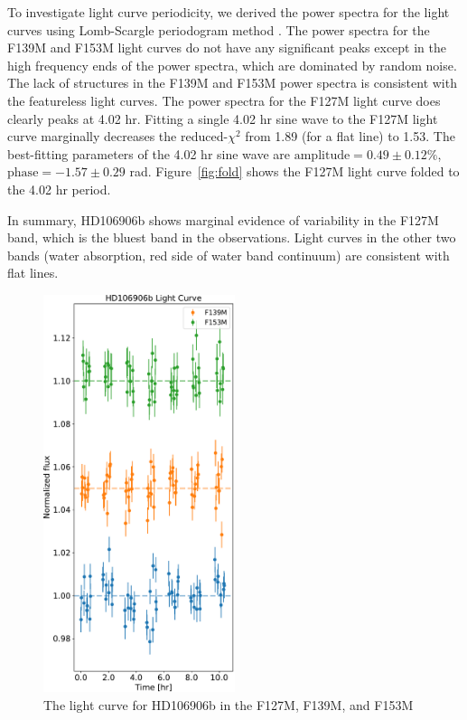 \documentclass[modern]{aastex62}
\begin{document}
To investigate light curve periodicity, we derived the power spectra for the light curves using Lomb-Scargle periodogram method \citep[][Figure~\ref{fig:periodogram}]{Lomb1976}. The power spectra for the F139M and F153M light curves do not have any significant peaks except in the high frequency ends of the power spectra, which are dominated by random noise. The lack of structures in the F139M and F153M power spectra is consistent with the featureless light curves. The power spectra for the F127M light curve does clearly peaks at 4.02 hr. Fitting a single 4.02 hr sine wave to the F127M light curve marginally decreases the reduced-$\chi^{2}$ from 1.89 (for a flat line) to 1.53. The best-fitting parameters of the 4.02 hr sine wave are $\mathrm{amplitude}=0.49\pm0.12\%$, $\mathrm{phase} = -1.57\pm0.29$ rad. Figure~\ref{fig:fold} shows the F127M light curve folded to the 4.02 hr period.

In summary, HD106906b shows marginal evidence of variability in the F127M band, which is the bluest band in the observations. Light curves in the other two bands (water absorption, red side of water band continuum) are consistent with flat lines.

\begin{figure}
  \centering
  \includegraphics[width=0.5\textwidth]{figures/HD106906_lightcurves.pdf}
  \caption{The light curve for HD106906b in the F127M, F139M, and F153M}
  \label{fig:lightcurve}
\end{figure}
\end{document}
